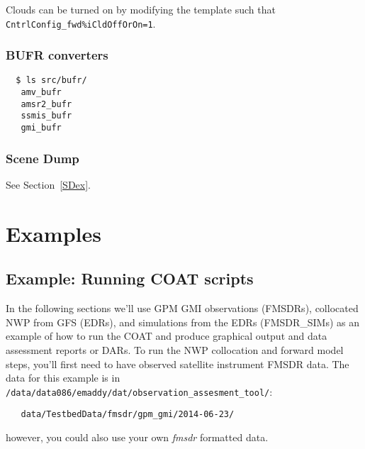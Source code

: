 \documentclass[10pt]{report}
\begin{document}
Clouds can be turned on by modifying the template such that 
{\tt CntrlConfig\_fwd\%iCldOffOrOn=1}.

\subsection{BUFR converters}
\begin{verbatim}
  $ ls src/bufr/
   amv_bufr
   amsr2_bufr
   ssmis_bufr
   gmi_bufr
\end{verbatim}

\subsection{Scene Dump}
See Section~\ref{SDex}.

\chapter{Examples}
\section{Example: Running COAT scripts}\label{sec:COATscripts}
In the following sections we'll use GPM GMI observations (FMSDRs), collocated NWP from GFS (EDRs), and 
simulations from the EDRs (FMSDR\_SIMs) as an example of how to run the COAT and produce graphical output 
and data assessment reports or DARs.
To run the NWP collocation and forward model steps, you'll first need to have observed satellite instrument 
FMSDR data.  The data for this example is in \\ {\tt /data/data086/emaddy/dat/observation\_assesment\_tool/}:
\begin{verbatim}
   data/TestbedData/fmsdr/gpm_gmi/2014-06-23/
\end{verbatim}
however, you could also use your own {\it fmsdr} formatted data. 
\end{document}

